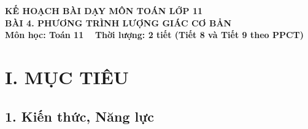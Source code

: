 \documentclass[12pt, a4paper]{article}
\begin{document}
  
  
\begin{center}  
    {\fontsize{14pt}{17pt}\selectfont \textbf{KẾ HOẠCH BÀI DẠY MÔN TOÁN LỚP 11}}\\[6pt]  
    {\fontsize{16pt}{19pt}\selectfont \textbf{BÀI 4. PHƯƠNG TRÌNH LƯỢNG GIÁC CƠ BẢN}}\\[4pt]  
    {\fontsize{12pt}{15pt}\selectfont \textbf{Môn học: Toán 11} \ \textbar \ \textbf{Thời lượng: 2 tiết (Tiết 8 và Tiết 9 theo PPCT)}}  
\end{center}  
  
\vspace{5pt}  
  
\section*{I. MỤC TIÊU}  
  
\subsection*{1. Kiến thức, Năng lực}  
  
\end{document}
